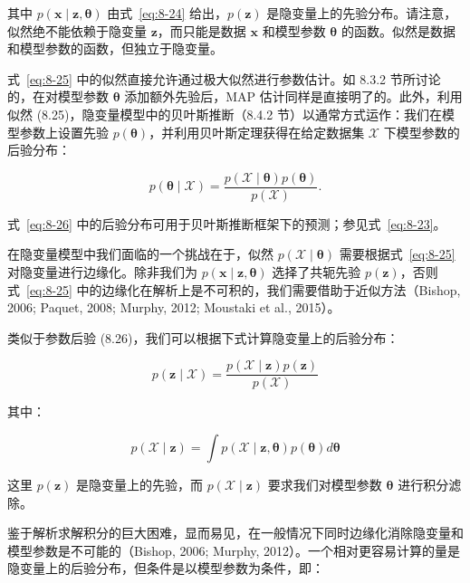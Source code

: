 其中 $ p(\boldsymbol{x} \mid \boldsymbol{z}, \boldsymbol{\theta}) $ 由式~\eqref{eq:8-24} 给出，$ p(\boldsymbol{z}) $ 是隐变量上的先验分布。请注意，似然绝不能依赖于隐变量 $ \boldsymbol{z} $，而只能是数据 $ \boldsymbol{x} $ 和模型参数 $ \boldsymbol{\theta} $ 的函数。似然是数据和模型参数的函数，但独立于隐变量。

式~\eqref{eq:8-25} 中的似然直接允许通过极大似然进行参数估计。如 8.3.2 节所讨论的，在对模型参数 $ \boldsymbol{\theta} $ 添加额外先验后，MAP 估计同样是直接明了的。此外，利用似然 (8.25)，隐变量模型中的贝叶斯推断（8.4.2 节）以通常方式运作：我们在模型参数上设置先验 $ p(\boldsymbol{\theta}) $，并利用贝叶斯定理获得在给定数据集 $ \mathcal{X} $ 下模型参数的后验分布：

\begin{equation}
p(\boldsymbol{\theta} \mid \mathcal{X}) = \frac{p(\mathcal{X} \mid \boldsymbol{\theta}) p(\boldsymbol{\theta})}{p(\mathcal{X})} .
\tag{8.26}\label{eq:8-26}
\end{equation}

式~\eqref{eq:8-26} 中的后验分布可用于贝叶斯推断框架下的预测；参见式~\eqref{eq:8-23}。

在隐变量模型中我们面临的一个挑战在于，似然 $ p(\mathcal{X} \mid \boldsymbol{\theta}) $ 需要根据式~\eqref{eq:8-25} 对隐变量进行边缘化。除非我们为 $ p(\boldsymbol{x} \mid \boldsymbol{z}, \boldsymbol{\theta}) $ 选择了共轭先验 $ p(\boldsymbol{z}) $，否则式~\eqref{eq:8-25} 中的边缘化在解析上是不可积的，我们需要借助于近似方法（Bishop, 2006; Paquet, 2008; Murphy, 2012; Moustaki et al., 2015）。

类似于参数后验 (8.26)，我们可以根据下式计算隐变量上的后验分布：

\begin{equation}
p(\boldsymbol{z} \mid \mathcal{X}) = \frac{p(\mathcal{X} \mid \boldsymbol{z}) p(\boldsymbol{z})}{p(\mathcal{X})}
\tag{8.27}\label{eq:8-27}
\end{equation}

其中：

\begin{equation*}
p(\mathcal{X} \mid \boldsymbol{z}) = \int p(\mathcal{X} \mid \boldsymbol{z}, \boldsymbol{\theta}) p(\boldsymbol{\theta}) d\boldsymbol{\theta}
\end{equation*}

这里 $ p(\boldsymbol{z}) $ 是隐变量上的先验，而 $ p(\mathcal{X} \mid \boldsymbol{z}) $ 要求我们对模型参数 $ \boldsymbol{\theta} $ 进行积分滤除。

鉴于解析求解积分的巨大困难，显而易见，在一般情况下同时边缘化消除隐变量和模型参数是不可能的（Bishop, 2006; Murphy, 2012）。一个相对更容易计算的量是隐变量上的后验分布，但条件是以模型参数为条件，即：

